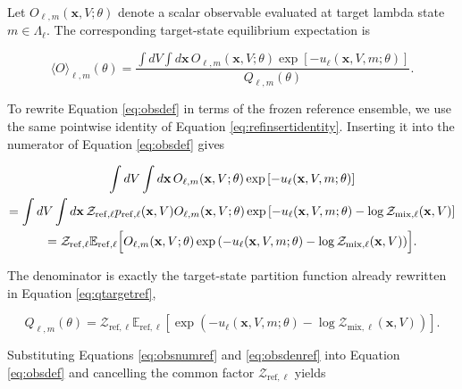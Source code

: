 Let $O_{\ell,m}(\mathbf{x}, V; \theta)$ denote a scalar observable evaluated at target lambda state $m \in \Lambda_\ell$. The corresponding target-state equilibrium expectation is

\begin{equation}
    \langle O \rangle_{\ell,m}(\theta)
    =
    \frac{
        \int dV \int d\mathbf{x} \,
        O_{\ell,m}(\mathbf{x}, V; \theta)
        \exp \left[
            -u_\ell(\mathbf{x}, V, m; \theta)
        \right]
    }{
        Q_{\ell,m}(\theta)
    }.
    \label{eq:obsdef}
\end{equation}

To rewrite Equation \eqref{eq:obsdef} in terms of the frozen reference ensemble, we use the same pointwise identity of Equation \eqref{eq:refinsertidentity}. Inserting it into the numerator of Equation \eqref{eq:obsdef} gives

\begin{multline}
    \int dV \int d\mathbf{x} \,
    O_{\ell,m}(\mathbf{x}, V; \theta)
    \exp \left[
        -u_\ell(\mathbf{x}, V, m; \theta)
    \right]
    \\
    =
    \int dV \int d\mathbf{x} \,
    \mathcal{Z}_{\mathrm{ref},\ell}
    p_{\mathrm{ref},\ell}(\mathbf{x}, V)
    O_{\ell,m}(\mathbf{x}, V; \theta)
    \exp \left[
        -u_\ell(\mathbf{x}, V, m; \theta)
        -
        \log \mathcal{Z}_{\mathrm{mix},\ell}(\mathbf{x}, V)
    \right]
    \\
    =
    \mathcal{Z}_{\mathrm{ref},\ell}
    \mathbb{E}_{\mathrm{ref},\ell}
    \Bigl[
        O_{\ell,m}(\mathbf{x}, V; \theta)
        \exp \left(
            -u_\ell(\mathbf{x}, V, m; \theta)
            -
            \log \mathcal{Z}_{\mathrm{mix},\ell}(\mathbf{x}, V)
        \right)
    \Bigr].
    \label{eq:obsnumref}
\end{multline}

The denominator is exactly the target-state partition function already rewritten in Equation \eqref{eq:qtargetref},

\begin{equation}
    Q_{\ell,m}(\theta)
    =
    \mathcal{Z}_{\mathrm{ref},\ell}
    \mathbb{E}_{\mathrm{ref},\ell}
    \left[
        \exp \left(
            -u_\ell(\mathbf{x}, V, m; \theta)
            -
            \log \mathcal{Z}_{\mathrm{mix},\ell}(\mathbf{x}, V)
        \right)
    \right].
    \label{eq:obsdenref}
\end{equation}

Substituting Equations \eqref{eq:obsnumref} and \eqref{eq:obsdenref} into Equation \eqref{eq:obsdef} and cancelling the common factor $\mathcal{Z}_{\mathrm{ref},\ell}$ yields

